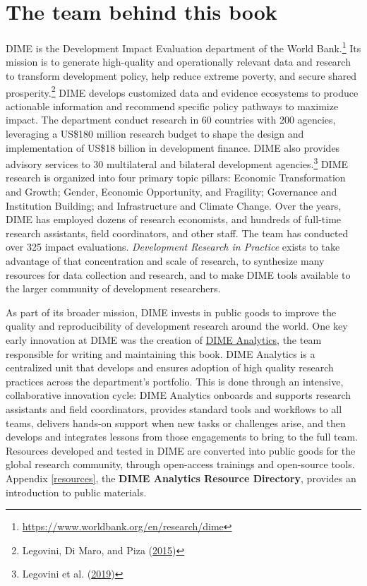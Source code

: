 \documentclass[
]{book}
\begin{document}
\hypertarget{the-team-behind-this-book}{%
\section*{The team behind this book}\label{the-team-behind-this-book}}

DIME is the Development Impact Evaluation department of the World Bank.\footnote{\url{https://www.worldbank.org/en/research/dime}}
Its mission is to generate high-quality and operationally relevant data and research
to transform development policy, help reduce extreme poverty, and secure shared prosperity.\footnote{Legovini, Di Maro, and Piza (\protect\hyperlink{ref-legovini2015impact}{2015})}
DIME develops customized data and evidence ecosystems to produce actionable information
and recommend specific policy pathways to maximize impact.
The department conduct research in 60 countries with 200 agencies, leveraging a
US\$180 million research budget to shape the design and implementation of
US\$18 billion in development finance.
DIME also provides advisory services to 30 multilateral and bilateral development agencies.\footnote{Legovini et al. (\protect\hyperlink{ref-legovini2019}{2019})}
DIME research is organized into four primary topic pillars:
Economic Transformation and Growth;
Gender, Economic Opportunity, and Fragility;
Governance and Institution Building;
and Infrastructure and Climate Change.
Over the years, DIME has employed dozens of research economists,
and hundreds of full-time research assistants, field coordinators, and other staff.
The team has conducted over 325 impact evaluations.
\emph{Development Research in Practice} exists to take advantage of that concentration and scale of research,
to synthesize many resources for data collection and research,
and to make DIME tools available to the larger community of development researchers.

As part of its broader mission, DIME invests in public goods
to improve the quality and reproducibility of development research around the world.
One key early innovation at DIME was the creation of
\href{https://www.worldbank.org/en/research/dime/data-and-analytics}{DIME Analytics},
the team responsible for writing and maintaining this book.
DIME Analytics is a centralized unit that develops and ensures adoption
of high quality research practices across the department's portfolio.
This is done through an intensive, collaborative innovation cycle:
DIME Analytics onboards and supports research assistants and field coordinators,
provides standard tools and workflows to all teams,
delivers hands-on support when new tasks or challenges arise,
and then develops and integrates lessons from those engagements to bring to the full team.
Resources developed and tested in DIME are converted into public goods
for the global research community, through open-access trainings and open-source tools.
Appendix \ref{resources}, the \textbf{DIME Analytics Resource Directory}, provides an introduction to public materials.
\end{document}
